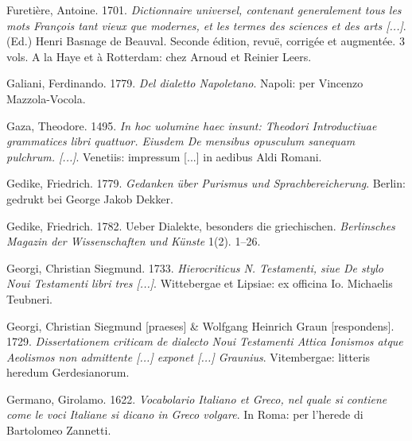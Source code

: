 \begin{styleStandard}
Furetière, Antoine. 1701. \textit{Dictionnaire universel, contenant generalement tous les mots François tant vieux que modernes, et les termes des sciences et des arts [...]}. (Ed.) Henri Basnage de Beauval. Seconde édition, revuë, corrigée et augmentée. 3 vols. A la Haye et à Rotterdam: chez Arnoud et Reinier Leers.
\end{styleStandard}

\begin{styleStandard}
Galiani, Ferdinando. 1779. \textit{Del dialetto Napoletano}. Napoli: per Vincenzo Mazzola-Vocola.
\end{styleStandard}

\begin{styleStandard}
Gaza, Theodore. 1495. \textit{In hoc uolumine haec insunt: Theodori Introductiuae grammatices libri quattuor. Eiusdem De mensibus opusculum sanequam pulchrum. [...]}. Venetiis: impressum [...] in aedibus Aldi Romani.
\end{styleStandard}

\begin{styleStandard}
Gedike, Friedrich. 1779. \textit{Gedanken über Purismus und Sprachbereicherung}. Berlin: gedrukt bei George Jakob Dekker.
\end{styleStandard}

\begin{styleStandard}
Gedike, Friedrich. 1782. Ueber Dialekte, besonders die griechischen. \textit{Berlinsches Magazin der Wissenschaften und Künste} 1(2). 1–26.
\end{styleStandard}

\begin{styleStandard}
Georgi, Christian Siegmund. 1733. \textit{Hierocriticus N. Testamenti, siue De stylo Noui Testamenti libri tres [...]}. Wittebergae et Lipsiae: ex officina Io. Michaelis Teubneri.
\end{styleStandard}

\begin{styleStandard}
Georgi, Christian Siegmund [praeses] \& Wolfgang Heinrich Graun [respondens]. 1729. \textit{Dissertationem criticam de dialecto Noui Testamenti Attica Ionismos atque Aeolismos non admittente [...] exponet [...] Graunius}. Vitembergae: litteris heredum Gerdesianorum.
\end{styleStandard}

\begin{styleStandard}
Germano, Girolamo. 1622. \textit{Vocabolario Italiano et Greco, nel quale si contiene come le voci Italiane si dicano in Greco volgare}. In Roma: per l’herede di Bartolomeo Zannetti.
\end{styleStandard}

